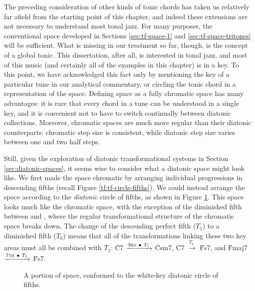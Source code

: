 The preceding consideration of other kinds of tonic chords has taken us
relatively far afield from the starting point of this chapter, and indeed
these extensions are not necessary to understand most tonal jazz. For many
purposes, the conventional space developed in Sections \ref{sec:tf-space-1}
and \ref{sec:tf-space-tritones} will be sufficient. What is missing in our
treatment so far, though, is the concept of a global tonic. This dissertation,
after all, is interested in tonal jazz, and most of this music (and certainly
all of the examples in this chapter) is in a key. To this point, we have
acknowledged this fact only by mentioning the key of a particular tune in our
analytical commentary, or circling the tonic chord in a representation of the
space. Defining \tf space as a fully chromatic space has many advantages: it
is rare that every chord in a tune can be understood in a single key, and it
is convenient not to have to switch continually between diatonic collections.
Moreover, chromatic spaces are much more regular than their diatonic
counterparts: chromatic step size is consistent, while diatonic step size
varies between one and two half steps.

Still, given the exploration of diatonic transformational systems in Section
\ref{sec:diatonic-spaces}, it seems wise to consider what a diatonic \tf space
might look like. We first made the space chromatic by arranging individual
\tfo progressions in descending fifths (recall Figure
\ref{tf:tf-circle-fifths}). We could instead arrange the space according to
the \emph{diatonic} circle of fifths, as shown in Figure
\ref{tfe:tf-diatonic-fifths}. This space looks much like the chromatic space,
with the exception of the diminished fifth between  and , where the
regular transformational structure of the chromatic space breaks down. The
change of the descending perfect fifth ($T_5$) to a diminished fifth ($T_6$)
means that all of the transformations linking these two key areas must all be
combined with $T_1$: \h{C7} $\xrightarrow{3\text{\textsc{rd}}\ \bullet\ T_1}$
\h{Csm7}, \h{C7} $\xrightarrow{T_6\;}$ \h{Fs7}, and \h{Fmaj7}
$\xrightarrow{7\text{\textsc{th}}\ \bullet\ T_1}$ \h{Fs7}.

\begin{figure}[tbp]
  \caption{A portion of \tf space, conformed to the white-key diatonic circle
    of fifths.}
  \label{tfe:tf-diatonic-fifths}
\end{figure}

